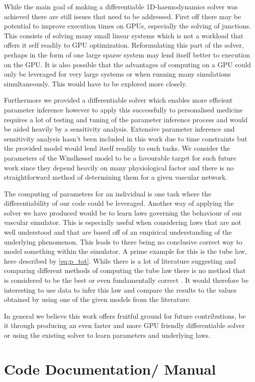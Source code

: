 \documentclass[a4paper, oneside]{discothesis}
\begin{document}
While the main goal of making a differentiable 1D-haemodynamics solver was achieved there are still issues that need to be addressed.
First off there may be potential to improve execution times on GPUs, especially the solving of junctions. 
This consists of solving many small linear systems which is not a workload that offers it self readily to GPU optimization.
Reformulating this part of the solver, perhaps in the form of one large sparse system may lend itself better to execution on the GPU.
It is also possible that the advantages of computing on a GPU could only be leveraged for very large systems or when running many simulations simultaneously.
This would have to be explored more closely.

Furthermore we provided a differentiable solver which enables more efficient parameter inference however to apply this successfully to personalised medicine requires a lot of testing and tuning of the parameter inference process and would be aided heavily by a sensitivity analysis.
Extensive parameter inference and sensitivity analysis hasn't been included in this work due to time constraints but the provided model would lend itself readily to such tasks.
We consider the parameters of the Windkessel model to be a favourable target for such future work since they depend heavily on many physiological factor and there is no straightforward method of determining them for a given vascular network.

The computing of parameters for an individual is one task where the differentiability of our code could be leveraged.
Another way of applying the solver we have produced would be to learn laws governing the behaviour of our vascular simulator.
This is especially useful when considering laws that are not well understood and that are based off of an empirical understanding of the underlying phenomenon.
This leads to there being no conclusive correct way to model something within the simulator.
A prime example for this is the tube law, here described by \autoref{eq:p_tot}.
While there is a lot of literature suggesting and comparing different methods of computing the tube law there is no method that is considered to be the best or even fundamentally correct \cite{gomez2017analysis}.
It would therefore be interesting to use data to infer this law and compare the results to the values obtained by using one of the given models from the literature.

In general we believe this work offers fruitful ground for future contributions, be it through producing an even faster and more GPU friendly differentiable solver or using the existing solver to learn parameters and underlying laws.






\appendix
\chapter{Code Documentation/ Manual} \label{app:doc}
\end{document}
